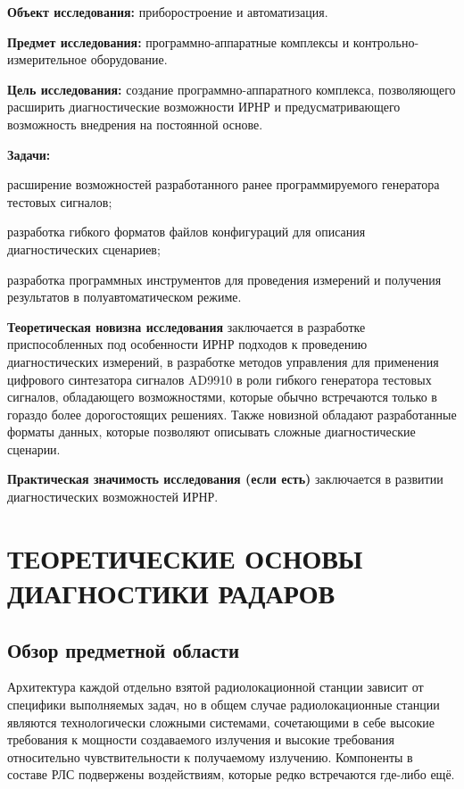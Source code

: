 \documentclass{report}
\begin{document}
{\bf Объект исследования:} приборостроение и автоматизация.

{\bf Предмет исследования:} программно-аппаратные комплексы и контрольно-измерительное оборудование.

{\bf Цель исследования:} создание программно-аппаратного комплекса, позволяющего расширить диагностические возможности ИРНР и предусматривающего возможность внедрения на постоянной основе.

{\bf Задачи:}
\begin{enumarabic}
\item расширение возможностей разработанного ранее программируемого генератора тестовых сигналов;
\item разработка гибкого форматов файлов конфигураций для описания диагностических сценариев;
\item разработка программных инструментов для проведения измерений и получения результатов в полуавтоматическом режиме.
\end{enumarabic}


{\bf Теоретическая новизна исследования} заключается в разработке приспособленных под особенности ИРНР подходов к проведению диагностических измерений, в разработке методов управления для применения цифрового синтезатора сигналов AD9910 в роли гибкого генератора тестовых сигналов, обладающего возможностями, которые обычно встречаются только в гораздо более дорогостоящих решениях. Также новизной обладают разработанные форматы данных, которые позволяют описывать сложные диагностические сценарии.

{\bf Практическая значимость исследования (если есть)} заключается в развитии диагностических возможностей ИРНР.

% 
\setcounter{section}{0} %
\setcounter{subsection}{0} %
\setcounter{equation}{0} %

\chapter{ТЕОРЕТИЧЕСКИЕ ОСНОВЫ ДИАГНОСТИКИ РАДАРОВ}

\section{Обзор предметной области}

Архитектура каждой отдельно взятой радиолокационной станции зависит от специфики выполняемых задач, но в общем случае радиолокационные станции являются технологически сложными системами, сочетающими в себе высокие требования к мощности создаваемого излучения и высокие требования относительно чувствительности к получаемому излучению. Компоненты в составе РЛС подвержены воздействиям, которые редко встречаются где-либо ещё.
\end{document}
